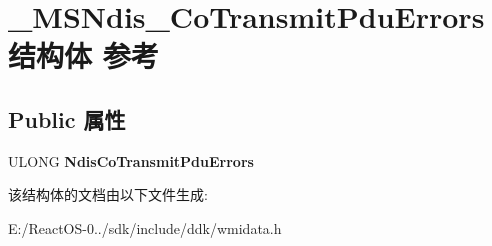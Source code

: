 \hypertarget{struct___m_s_ndis___co_transmit_pdu_errors}{}\section{\+\_\+\+M\+S\+Ndis\+\_\+\+Co\+Transmit\+Pdu\+Errors结构体 参考}
\label{struct___m_s_ndis___co_transmit_pdu_errors}
\subsection*{Public 属性}
\begin{DoxyCompactItemize}
\item 
\mbox{\label{struct___m_s_ndis___co_transmit_pdu_errors_ae26d00d6d9b1789d568a367e355febbc}} 
U\+L\+O\+NG {\bfseries Ndis\+Co\+Transmit\+Pdu\+Errors}
\end{DoxyCompactItemize}


该结构体的文档由以下文件生成\+:\begin{DoxyCompactItemize}
\item 
E\+:/\+React\+O\+S-\/0../sdk/include/ddk/wmidata.\+h\end{DoxyCompactItemize}

